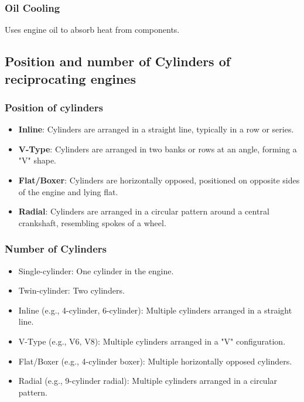 \documentclass{article}
\begin{document}
\subsubsection*{Oil Cooling}
Uses engine oil to absorb heat from components.

\subsection*{Position and number of Cylinders of reciprocating engines}
\subsubsection*{Position of cylinders}
\begin{itemize}
	\item \textbf{Inline}: Cylinders are arranged in a straight line, typically in a row or series.
\item \textbf{V-Type}: Cylinders are arranged in two banks or rows at an angle, forming a "V" shape.
\item \textbf{Flat/Boxer}: Cylinders are horizontally opposed, positioned on opposite sides of the engine and lying flat.
\item \textbf{Radial}: Cylinders are arranged in a circular pattern around a central crankshaft, resembling spokes of a wheel.
\end{itemize}

\subsubsection*{Number of Cylinders}
\begin{itemize}
	\item Single-cylinder: One cylinder in the engine.
	\item Twin-cylinder: Two cylinders.
	\item Inline (e.g., 4-cylinder, 6-cylinder): Multiple cylinders arranged in a straight line.
	\item V-Type (e.g., V6, V8): Multiple cylinders arranged in a "V" configuration.
	\item Flat/Boxer (e.g., 4-cylinder boxer): Multiple horizontally opposed cylinders.
	\item Radial (e.g., 9-cylinder radial): Multiple cylinders arranged in a circular pattern.
\end{itemize}
\end{document}
